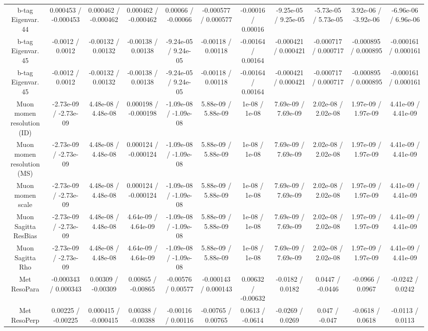{\begin{landscape}
\begin{longtable}{@{\extracolsep{\fill}}| *{11}{c|}}
  b-tag Eigenvar. 44 & 0.000453 / -0.000453 & 0.000462 / -0.000462 & 0.000462 / -0.000462 & 0.00066 / -0.00066 & -0.000577 / 0.000577 & -0.00016 / 0.00016 & -9.25e-05 / 9.25e-05 & -5.73e-05 / 5.73e-05 & 3.92e-06 / -3.92e-06 & -6.96e-06 / 6.96e-06 \\ 
  b-tag Eigenvar. 45 & -0.0012 / 0.0012 & -0.00132 / 0.00132 & -0.00138 / 0.00138 & -9.24e-05 / 9.24e-05 & -0.00118 / 0.00118 & -0.00164 / 0.00164 & -0.000421 / 0.000421 & -0.000717 / 0.000717 & -0.000895 / 0.000895 & -0.000161 / 0.000161 \\ 
  b-tag Eigenvar. 45 & -0.0012 / 0.0012 & -0.00132 / 0.00132 & -0.00138 / 0.00138 & -9.24e-05 / 9.24e-05 & -0.00118 / 0.00118 & -0.00164 / 0.00164 & -0.000421 / 0.000421 & -0.000717 / 0.000717 & -0.000895 / 0.000895 & -0.000161 / 0.000161 \\ 
  Muon momen resolution (ID) & -2.73e-09 / -2.73e-09 & 4.48e-08 / 4.48e-08 & 0.000198 / -0.000198 & -1.09e-08 / -1.09e-08 & 5.88e-09 / 5.88e-09 & 1e-08 / 1e-08 & 7.69e-09 / 7.69e-09 & 2.02e-08 / 2.02e-08 & 1.97e-09 / 1.97e-09 & 4.41e-09 / 4.41e-09 \\ 
  Muon momen resolution (MS) & -2.73e-09 / -2.73e-09 & 4.48e-08 / 4.48e-08 & 0.000124 / -0.000124 & -1.09e-08 / -1.09e-08 & 5.88e-09 / 5.88e-09 & 1e-08 / 1e-08 & 7.69e-09 / 7.69e-09 & 2.02e-08 / 2.02e-08 & 1.97e-09 / 1.97e-09 & 4.41e-09 / 4.41e-09 \\ 
  Muon momen scale & -2.73e-09 / -2.73e-09 & 4.48e-08 / 4.48e-08 & 0.000124 / -0.000124 & -1.09e-08 / -1.09e-08 & 5.88e-09 / 5.88e-09 & 1e-08 / 1e-08 & 7.69e-09 / 7.69e-09 & 2.02e-08 / 2.02e-08 & 1.97e-09 / 1.97e-09 & 4.41e-09 / 4.41e-09 \\ 
  Muon Sagitta ResBias & -2.73e-09 / -2.73e-09 & 4.48e-08 / 4.48e-08 & 4.64e-09 / 4.64e-09 & -1.09e-08 / -1.09e-08 & 5.88e-09 / 5.88e-09 & 1e-08 / 1e-08 & 7.69e-09 / 7.69e-09 & 2.02e-08 / 2.02e-08 & 1.97e-09 / 1.97e-09 & 4.41e-09 / 4.41e-09 \\ 
  Muon Sagitta Rho & -2.73e-09 / -2.73e-09 & 4.48e-08 / 4.48e-08 & 4.64e-09 / 4.64e-09 & -1.09e-08 / -1.09e-08 & 5.88e-09 / 5.88e-09 & 1e-08 / 1e-08 & 7.69e-09 / 7.69e-09 & 2.02e-08 / 2.02e-08 & 1.97e-09 / 1.97e-09 & 4.41e-09 / 4.41e-09 \\ 
  Met ResoPara & -0.000343 / 0.000343 & 0.00309 / -0.00309 & 0.00865 / -0.00865 & -0.00576 / 0.00577 & -0.000143 / 0.000143 & 0.00632 / -0.00632 & -0.0182 / 0.0182 & 0.0447 / -0.0446 & -0.0966 / 0.0967 & -0.0242 / 0.0242 \\ 
  Met ResoPerp & 0.00225 / -0.00225 & 0.000415 / -0.000415 & 0.00388 / -0.00388 & -0.00116 / 0.00116 & -0.00765 / 0.00765 & 0.0613 / -0.0614 & -0.0269 / 0.0269 & 0.047 / -0.047 & -0.0618 / 0.0618 & -0.0113 / 0.0113 \\ 

\end{longtable}
\end{landscape}}
